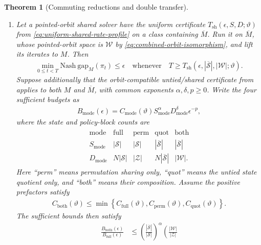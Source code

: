 \documentclass{article}
\theoremstyle{plain}
\newtheorem{theorem}{Theorem}
\theoremstyle{definition}
\theoremstyle{remark}
\newcommand{\Nash}{\mathrm{Nash\ gap}}
\newcommand{\St}{\mathcal{S}}
\newcommand{\abs}[1]{\left\lvert#1\right\rvert}
\newcommand{\quotient}[1]{\overline{#1}}
\begin{document}
\begin{theorem}[Commuting reductions and double transfer]
\begin{enumerate}[label=\arabic*.,leftmargin=2.0em,itemsep=2pt,topsep=2pt]
  \item Let a pointed-orbit shared solver have the uniform certificate
  $T_{\mathrm{sh}}(\epsilon,S,D;\vartheta)$ from
  \eqref{eq:uniform-shared-rate-profile} on a class containing $\quotient M$.
  Run it on $\quotient M$, whose pointed-orbit space is $\mathcal W$ by
  \eqref{eq:combined-orbit-isomorphism}, and lift its iterates to $M$. Then
  \begin{align}
    \min_{0\le t<T}\Nash_M(\pi_t)
    \le\epsilon
    \quad\text{whenever}\quad
    T\ge
    T_{\mathrm{sh}}\!\left(
      \epsilon,\abs{\quotient\St},\abs{\mathcal W};\vartheta
    \right).
    \label{eq:combined-black-box-rate}
  \end{align}
  Suppose additionally that the orbit-compatible untied/shared certificate from
   applies to both $M$ and $\quotient M$,
  with common exponents $\alpha,\delta,p\ge0$. Write the four sufficient
  budgets as
  \begin{align*}
    B_{\mathrm{mode}}(\epsilon)
    =
    C_{\mathrm{mode}}(\vartheta)
    S_{\mathrm{mode}}^\alpha D_{\mathrm{mode}}^\delta\epsilon^{-p},
  \end{align*}
  where the state and policy-block counts are
  \begin{align*}
    \begin{array}{c|cccc}
      \mathrm{mode}
      &\mathrm{full}&\mathrm{perm}&\mathrm{quot}&\mathrm{both}\\ \hline
      S_{\mathrm{mode}}
      &\abs\St&\abs\St&\abs{\quotient\St}&\abs{\quotient\St}\\
      D_{\mathrm{mode}}
      &N\abs\St&\abs{\mathcal Z}
      &N\abs{\quotient\St}&\abs{\mathcal W}.
    \end{array}
  \end{align*}
  Here ``perm'' means permutation sharing only, ``quot'' means the untied
  state quotient only, and ``both'' means their composition. Assume the
  positive prefactors satisfy
  \begin{align*}
    C_{\mathrm{both}}(\vartheta)
    \le
    \min\left\{
      C_{\mathrm{full}}(\vartheta),
      C_{\mathrm{perm}}(\vartheta),
      C_{\mathrm{quot}}(\vartheta)
    \right\}.
  \end{align*}
  The sufficient bounds then satisfy
  \begin{align}
    \frac{B_{\mathrm{both}}(\epsilon)}
         {B_{\mathrm{full}}(\epsilon)}
    &\le
    \left(
      \frac{\abs{\quotient\St}}{\abs\St}
    \right)^\alpha
    \left(
      \frac{\abs{\mathcal W}}{\abs{\mathcal Z}}

\end{align}
\end{enumerate}
\end{theorem}
\end{document}
